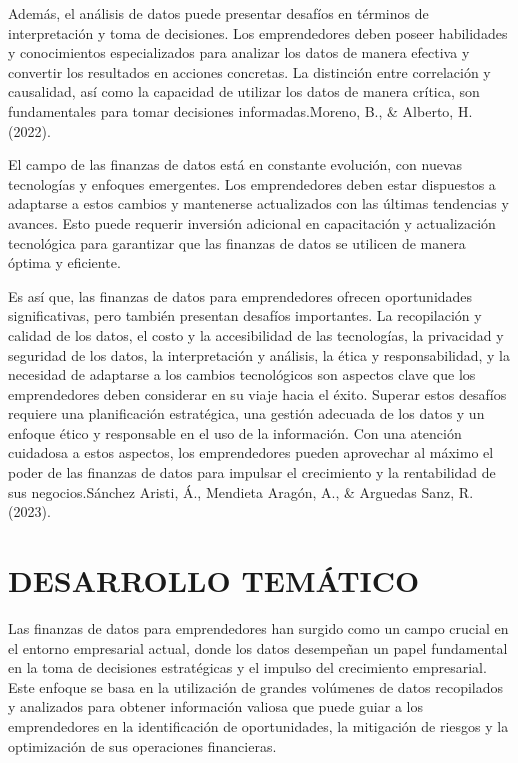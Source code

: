 \documentclass[
  letterpaper,
  DIV=11,
  numbers=noendperiod]{scrreprt}
\begin{document}
Además, el análisis de datos puede presentar desafíos en términos de
interpretación y toma de decisiones. Los emprendedores deben poseer
habilidades y conocimientos especializados para analizar los datos de
manera efectiva y convertir los resultados en acciones concretas. La
distinción entre correlación y causalidad, así como la capacidad de
utilizar los datos de manera crítica, son fundamentales para tomar
decisiones informadas.Moreno, B., \& Alberto, H. (2022).

El campo de las finanzas de datos está en constante evolución, con
nuevas tecnologías y enfoques emergentes. Los emprendedores deben estar
dispuestos a adaptarse a estos cambios y mantenerse actualizados con las
últimas tendencias y avances. Esto puede requerir inversión adicional en
capacitación y actualización tecnológica para garantizar que las
finanzas de datos se utilicen de manera óptima y eficiente.

Es así que, las finanzas de datos para emprendedores ofrecen
oportunidades significativas, pero también presentan desafíos
importantes. La recopilación y calidad de los datos, el costo y la
accesibilidad de las tecnologías, la privacidad y seguridad de los
datos, la interpretación y análisis, la ética y responsabilidad, y la
necesidad de adaptarse a los cambios tecnológicos son aspectos clave que
los emprendedores deben considerar en su viaje hacia el éxito. Superar
estos desafíos requiere una planificación estratégica, una gestión
adecuada de los datos y un enfoque ético y responsable en el uso de la
información. Con una atención cuidadosa a estos aspectos, los
emprendedores pueden aprovechar al máximo el poder de las finanzas de
datos para impulsar el crecimiento y la rentabilidad de sus
negocios.Sánchez Aristi, Á., Mendieta Aragón, A., \& Arguedas Sanz, R.
(2023).

\hypertarget{desarrollo-temuxe1tico}{%
\section{DESARROLLO TEMÁTICO}\label{desarrollo-temuxe1tico}}

Las finanzas de datos para emprendedores han surgido como un campo
crucial en el entorno empresarial actual, donde los datos desempeñan un
papel fundamental en la toma de decisiones estratégicas y el impulso del
crecimiento empresarial. Este enfoque se basa en la utilización de
grandes volúmenes de datos recopilados y analizados para obtener
información valiosa que puede guiar a los emprendedores en la
identificación de oportunidades, la mitigación de riesgos y la
optimización de sus operaciones financieras.
\end{document}
